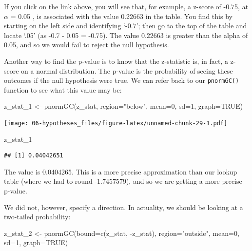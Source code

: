 \documentclass[
]{book}
\newenvironment{Shaded}{\begin{snugshade}}{\end{snugshade}}
\newcommand{\AttributeTok}[1]{\textcolor[rgb]{0.77,0.63,0.00}{#1}}
\newcommand{\ConstantTok}[1]{\textcolor[rgb]{0.00,0.00,0.00}{#1}}
\newcommand{\DecValTok}[1]{\textcolor[rgb]{0.00,0.00,0.81}{#1}}
\newcommand{\FunctionTok}[1]{\textcolor[rgb]{0.00,0.00,0.00}{#1}}
\newcommand{\NormalTok}[1]{#1}
\newcommand{\OtherTok}[1]{\textcolor[rgb]{0.56,0.35,0.01}{#1}}
\newcommand{\SpecialCharTok}[1]{\textcolor[rgb]{0.00,0.00,0.00}{#1}}
\newcommand{\StringTok}[1]{\textcolor[rgb]{0.31,0.60,0.02}{#1}}
\begin{document}
If you click on the link above, you will see that, for example, a z-score of -0.75, at \(\alpha\) = 0.05 , is associated with the value 0.22663 in the table. You find this by starting on the left side and identifying `-0.7'; then go to the top of the table and locate `.05' (as -0.7 - 0.05 = -0.75). The value 0.22663 is greater than the alpha of 0.05, and so we would fail to reject the null hypothesis.

Another way to find the p-value is to know that the z-statistic is, in fact, a z-score on a normal distribution. The p-value is the probability of seeing these outcomes if the null hypothesis were true. We can refer back to our \texttt{pnormGC()} function to see what this value may be:

\begin{Shaded}
\begin{Highlighting}[]
\NormalTok{z\_stat\_1 }\OtherTok{\textless{}{-}} \FunctionTok{pnormGC}\NormalTok{(z\_stat, }\AttributeTok{region=}\StringTok{"below"}\NormalTok{, }\AttributeTok{mean=}\DecValTok{0}\NormalTok{, }\AttributeTok{sd=}\DecValTok{1}\NormalTok{, }\AttributeTok{graph=}\ConstantTok{TRUE}\NormalTok{) }
\end{Highlighting}
\end{Shaded}

\texttt{[image: 06-hypotheses\_files/figure-latex/unnamed-chunk-29-1.pdf]}

\begin{Shaded}
\begin{Highlighting}[]
\NormalTok{z\_stat\_1}
\end{Highlighting}
\end{Shaded}

\begin{verbatim}
## [1] 0.04042651
\end{verbatim}

The value is 0.0404265. This is a more precise approximation than our lookup table (where we had to round -1.7457579), and so we are getting a more precise p-value.

We did not, however, specify a direction. In actuality, we should be looking at a two-tailed probability:

\begin{Shaded}
\begin{Highlighting}[]
\NormalTok{z\_stat\_2 }\OtherTok{\textless{}{-}} \FunctionTok{pnormGC}\NormalTok{(}\AttributeTok{bound=}\FunctionTok{c}\NormalTok{(z\_stat, }\SpecialCharTok{{-}}\NormalTok{z\_stat), }\AttributeTok{region=}\StringTok{"outside"}\NormalTok{, }\AttributeTok{mean=}\DecValTok{0}\NormalTok{, }\AttributeTok{sd=}\DecValTok{1}\NormalTok{, }\AttributeTok{graph=}\ConstantTok{TRUE}\NormalTok{) }
\end{Highlighting}
\end{Shaded}
\end{document}
